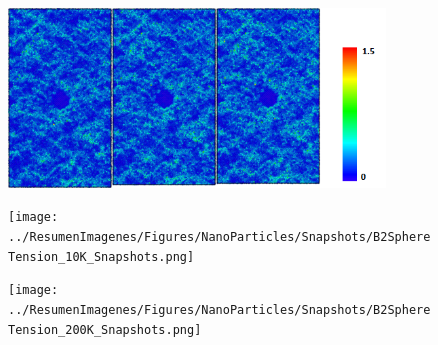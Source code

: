 \begin{figure}[htp]
\centering
\includegraphics[width=10cm]{../ResumenImagenes/Figures/NanoParticles/Snapshots/cuSphereCompression_300K_Snapshots.png}
\caption[Inclusión de Cu-FCC bajo compresión a 300K]{}
\label{C4:fg:snapshot_comp_FCC_300K}
\end{figure}

\begin{figure}[htp]
\centering
\texttt{[image: ../ResumenImagenes/Figures/NanoParticles/Snapshots/B2SphereTension\_10K\_Snapshots.png]}
\caption[Inclusión de CuZr-B2 bajo tracción a 10K]{}
\label{C4:fg:snapshot_ten_B2_10K}
\end{figure}

\begin{figure}[htp]
\centering
\texttt{[image: ../ResumenImagenes/Figures/NanoParticles/Snapshots/B2SphereTension\_200K\_Snapshots.png]}
\caption[Inclusión de CuZr-B2 bajo tracción a 200K]{}
\label{C4:fg:snapshot_ten_B2_200K}
\end{figure}


\clearpage

